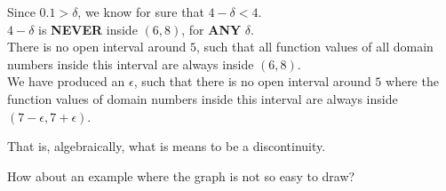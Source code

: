 \documentclass{ximera}
\begin{document}
\begin{example}
\begin{explanation}
\begin{image}
\end{image}



Since $0.1 > \delta$, we know for sure that $4 - \delta < 4$.  \\
$4 - \delta$ is \textbf{\textcolor{red!80!black}{NEVER}} inside $(6, 8)$, for \textbf{\textcolor{red!80!black}{ANY}} $\delta$.\\



There is no open interval around $5$, such that all function values of all domain numbers inside this interval are always inside $(6,8)$. \\




We have produced an $\epsilon$, such that there is no open interval around $5$ where the function values of domain numbers inside this interval are always inside $(7-\epsilon , 7+\epsilon)$.


That is, algebraically, what is means to be a discontinuity.



\end{explanation}
\end{example}




























How about an example where the graph is not so easy to draw?
\end{document}
